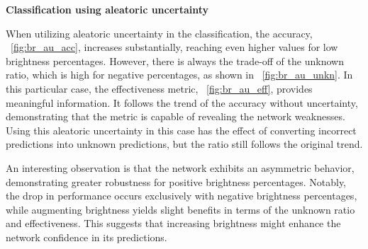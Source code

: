 \vspace{0.3cm}
\textbf{Classification using aleatoric uncertainty}
\vspace{0.1cm}

When utilizing aleatoric uncertainty in the classification, the accuracy, \Fig~\ref{fig:br_au_acc}, increases substantially, reaching even higher values for low brightness percentages. However, there is always the trade-off of the unknown ratio, which is high for negative percentages, as shown in \Fig~\ref{fig:br_au_unkn}. In this particular case, the effectiveness metric, \Fig~\ref{fig:br_au_eff}, provides meaningful information. It follows the trend of the accuracy without uncertainty, demonstrating that the metric is capable of revealing the network weaknesses. Using this aleatoric uncertainty in this case has the effect of converting incorrect predictions into unknown predictions, but the ratio still follows the original trend.

An interesting observation is that the network exhibits an asymmetric behavior, demonstrating greater robustness for positive brightness percentages. Notably, the drop in performance occurs exclusively with negative brightness percentages, while augmenting brightness yields slight benefits in terms of the unknown ratio and effectiveness. This suggests that increasing brightness might enhance the network confidence in its predictions.

